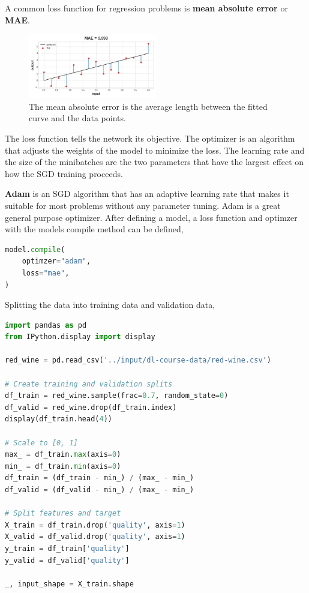 \noindent A common loss function for regression problems is \textbf{mean absolute
error} or \textbf{MAE}.

\begin{figure}[htp]
	\centering
	\includegraphics[width=0.5\textwidth]{../assets/machine_learning_random/mean_absolute_error.png}
	\caption{The mean absolute error is the average length between the fitted curve and the data points.}
\end{figure}

\noindent The loss function tells the network its objective. The optimizer is an
algorithm that adjusts the weights of the model to minimize the loss. The learning rate
and the size of the minibatches are the two parameters that have the largest effect
on how the SGD training proceeds.

\noindent \textbf{Adam} is an SGD algorithm that has an adaptive learning rate that
makes it suitable for most problems without any parameter tuning. Adam is a great general
purpose optimizer. After defining a model, a loss function and optimzer with the models
compile method can be defined,

\begin{lstlisting}[language=Python]
model.compile(
	optimzer="adam",
	loss="mae",
)
\end{lstlisting}

\noindent Splitting the data into training data and validation data,
\begin{lstlisting}[language=Python]
import pandas as pd
from IPython.display import display

red_wine = pd.read_csv('../input/dl-course-data/red-wine.csv')

# Create training and validation splits
df_train = red_wine.sample(frac=0.7, random_state=0)
df_valid = red_wine.drop(df_train.index)
display(df_train.head(4))

# Scale to [0, 1]
max_ = df_train.max(axis=0)
min_ = df_train.min(axis=0)
df_train = (df_train - min_) / (max_ - min_)
df_valid = (df_valid - min_) / (max_ - min_)

# Split features and target
X_train = df_train.drop('quality', axis=1)
X_valid = df_valid.drop('quality', axis=1)
y_train = df_train['quality']
y_valid = df_valid['quality']

_, input_shape = X_train.shape
\end{lstlisting}


